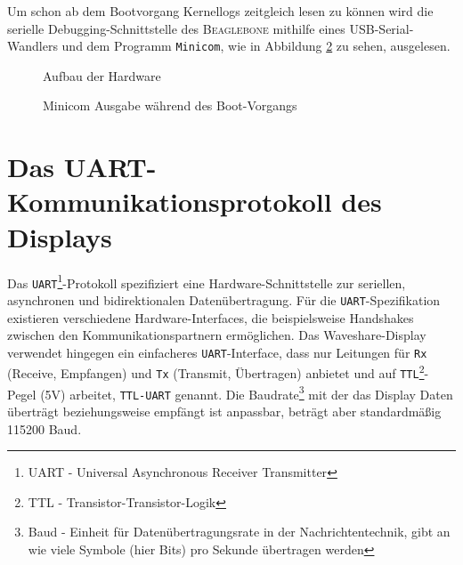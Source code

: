 Um schon ab dem Bootvorgang Kernellogs zeitgleich lesen zu können wird die serielle Debugging-Schnittstelle des \textsc{Beaglebone} mithilfe eines USB-Serial-Wandlers und dem Programm \texttt{Minicom}, wie in Abbildung \ref{pic:minicom} zu sehen, ausgelesen. 

\begin{figure}[H]
  \centering
  \caption{Aufbau der Hardware}
  \label{pic:hw_aufbau}
\end{figure}

\begin{figure}[H]
  \centering
  \caption{Minicom Ausgabe während des Boot-Vorgangs}
  \label{pic:minicom}
\end{figure}

\section{Das UART-Kommunikationsprotokoll des Displays}
Das \texttt{UART}\footnote{UART - Universal Asynchronous Receiver Transmitter}-Protokoll spezifiziert eine Hardware-Schnittstelle zur seriellen, asynchronen und bidirektionalen Datenübertragung. Für die \texttt{UART}-Spezifikation existieren verschiedene Hardware-Interfaces, die beispielsweise Handshakes zwischen den Kommunikationspartnern ermöglichen. Das Waveshare-Display verwendet hingegen ein einfacheres \texttt{UART}-Interface, dass nur Leitungen für \texttt{Rx} (Receive, Empfangen) und \texttt{Tx} (Transmit, Übertragen) anbietet und auf \texttt{TTL}\footnote{TTL - Transistor-Transistor-Logik}-Pegel (5V) arbeitet, \texttt{TTL-UART} genannt. Die Baudrate\footnote{Baud - Einheit für Datenübertragungsrate in der Nachrichtentechnik, gibt an wie viele Symbole (hier Bits) pro Sekunde übertragen werden} mit der das Display Daten überträgt beziehungsweise empfängt ist anpassbar, beträgt aber standardmäßig 115200 Baud. 
\newline

